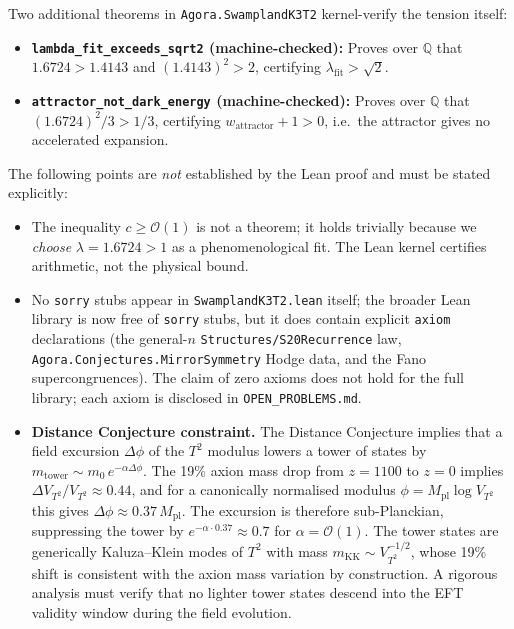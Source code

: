 \documentclass[12pt]{article}
\begin{document}
Two additional theorems in \texttt{Agora.SwamplandK3T2} kernel-verify the tension itself:
\begin{itemize}
  \item \textbf{\texttt{lambda\_fit\_exceeds\_sqrt2} (machine-checked):} Proves over $\mathbb{Q}$
    that $1.6724 > 1.4143$ and $(1.4143)^2 > 2$, certifying $\lambda_\mathrm{fit} > \sqrt{2}$.
  \item \textbf{\texttt{attractor\_not\_dark\_energy} (machine-checked):} Proves over $\mathbb{Q}$
    that $(1.6724)^2/3 > 1/3$, certifying $w_\mathrm{attractor} + 1 > 0$, i.e.\ the attractor
    gives no accelerated expansion.
\end{itemize}

The following points are \emph{not} established by the Lean proof and must be stated explicitly:
\begin{itemize}
  \item The inequality $c \ge \mathcal{O}(1)$ is not a theorem; it holds trivially because we
    \emph{choose} $\lambda = 1.6724 > 1$ as a phenomenological fit. The Lean kernel
    certifies arithmetic, not the physical bound.
  \item No \texttt{sorry} stubs appear in \texttt{SwamplandK3T2.lean} itself;
    the broader Lean library is now free of \texttt{sorry} stubs, but it does contain
    explicit \texttt{axiom} declarations (the general-$n$ \texttt{Structures/S20Recurrence}
    law, \texttt{Agora.Conjectures.MirrorSymmetry} Hodge data, and the Fano
    supercongruences). The claim of zero axioms does not hold for the full library;
    each axiom is disclosed in \texttt{OPEN\_PROBLEMS.md}.
  \item \textbf{Distance Conjecture constraint.} The Distance Conjecture \cite{ooguri2006geometry} implies that a field excursion $\Delta\phi$ of the $T^2$ modulus lowers a tower of states by $m_\mathrm{tower} \sim m_0\,e^{-\alpha\Delta\phi}$. The 19\% axion mass drop from $z=1100$ to $z=0$ implies $\Delta V_{T^2}/V_{T^2}\approx0.44$, and for a canonically normalised modulus $\phi = M_\mathrm{pl}\log V_{T^2}$ this gives $\Delta\phi\approx0.37\,M_\mathrm{pl}$. The excursion is therefore sub-Planckian, suppressing the tower by $e^{-\alpha\cdot0.37}\approx0.7$ for $\alpha=\mathcal{O}(1)$. The tower states are generically Kaluza–Klein modes of $T^2$ with mass $m_\mathrm{KK}\sim V_{T^2}^{-1/2}$, whose 19\% shift is consistent with the axion mass variation by construction. A rigorous analysis must verify that no lighter tower states descend into the EFT validity window during the field evolution.
\end{itemize}
\end{document}
